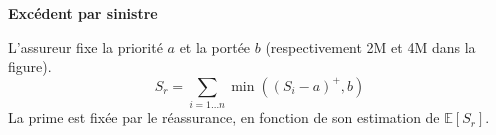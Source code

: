 \begin{f}
\textbf{Excédent par sinistre}
	
L'assureur fixe la priorité \(a\) et la portée \(b\) (respectivement 2M\EUR{} et  4M\EUR{} dans la figure).
\[
S_r= \sum_{i=1\ldots n} \min\left( \left( S_i-a\right)^+,b\right)  
\]
La prime est fixée par le réassurance, en fonction de son estimation de \(\mathbb{E}[S_r]\).


\end{f}
